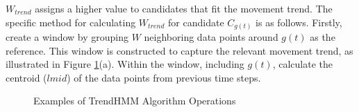 \documentclass[preprint,12pt]{elsarticle}
\begin{document}
$W_{trend}$ assigns a higher value to candidates that fit the movement trend.
The specific method for calculating $W_{trend}$ for candidate $C_{g(t)}$ is as follows. Firstly, create a window by grouping $W$ neighboring data points around $g(t)$ as the reference. This window is constructed to capture the relevant movement trend, as illustrated in Figure \ref{fig:fig4}(a). Within the window, including $g(t)$, calculate the centroid ($lmid$) of the data points from previous time steps.
\begin{figure}
	\centering
	\caption{Examples of TrendHMM Algorithm Operations}
	\label{fig:fig4}
\end{figure}
\end{document}
